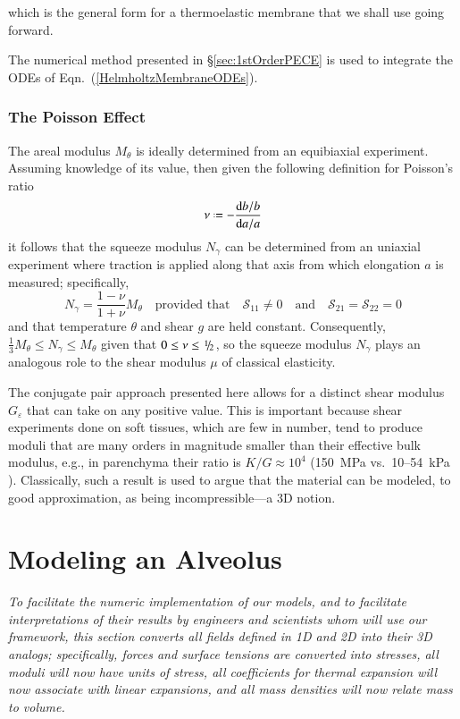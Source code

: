 which is the general form for a thermo\-elastic membrane that we shall use going forward. 

The numerical method presented in \S\ref{sec:1stOrderPECE} is used to integrate the ODEs of Eqn.~(\ref{HelmholtzMembraneODEs}).

\subsubsection{The Poisson Effect}

The areal modulus $M_{\theta}$ is ideally determined from an equibiaxial experiment.  Assuming knowledge of its value, then given the following definition for Poisson's ratio
\begin{displaymath}
\nu \defeq - \frac{\mathrm{d}b / b}{\mathrm{d}a / a}
\end{displaymath}
it follows that the squeeze modulus $N_{\gamma}$ can be determined from an uniaxial experiment where traction is applied along that axis from which elongation $a$ is measured; specifically,
\begin{displaymath}
N_{\gamma} = \frac{1 - \nu}{1 + \nu} M_{\theta}
\quad \text{provided that} \quad
\mathcal{S}_{11} \neq 0 
\quad \text{and} \quad
\mathcal{S}_{21} = \mathcal{S}_{22} = 0 
\end{displaymath}
and that temperature $\theta$ and shear $g$ are held constant.  Consequently, $\tfrac{1}{3} M_{\theta} \leq N_{\gamma} \leq M_{\theta}$ given that $0 \leq \nu \leq \textfrac{1}{2}$, so the squeeze modulus $N_{\gamma}$ plays an analogous role to the shear modulus $\mu$ of classical elasticity.  

The conjugate pair approach presented here allows for a distinct shear modulus $G_{\varepsilon}$ that can take on any positive value.  This is important because shear experiments done on soft tissues, which are few in number, tend to produce moduli that are many orders in magnitude smaller than their effective bulk modulus, e.g., in parenchyma their ratio is $K/G \approx 10^{4}$ (150~MPa vs.\ 10--54~kPa \cite{Sarafetal07}).  Classically, such a result is used to argue that the material can be modeled, to  good approximation, as being incompressible---a 3D notion.


\section{Modeling an Alveolus}
\label{secAlveolus}

\textit{To facilitate the numeric implementation of our models, and to facilitate interpretations of their results by engineers and scientists whom will use our framework, this section converts all fields defined in 1D and 2D into their 3D analogs; specifically, forces and surface tensions are converted into stresses, all moduli will now have units of stress, all coefficients for thermal expansion will now associate with linear expansions, and all mass densities will now relate mass to volume.}

